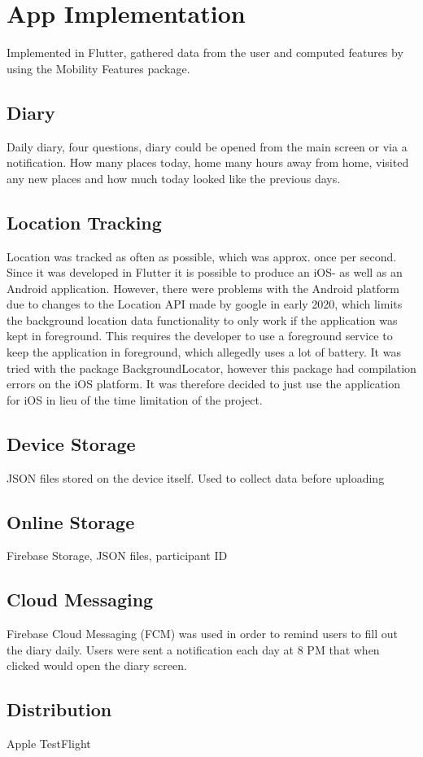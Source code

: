 \section{App Implementation}
Implemented in Flutter, gathered data from the user and computed features by using the Mobility Features package. 

\subsection{Diary}
Daily diary, four questions, diary could be opened from the main screen or via a notification. How many places today, home many hours away from home, visited any new places and how much today looked like the previous days.


\subsection{Location Tracking}
Location was tracked as often as possible, which was approx. once per second. Since it was developed in Flutter it is possible to produce an iOS- as well as an Android application. However, there were problems with the Android platform due to changes to the Location API made by google in early 2020, which limits the background location data functionality to only work if the application was kept in foreground. This requires the developer to use a foreground service to keep the application in foreground, which allegedly uses a lot of battery. It was tried with the package BackgroundLocator, however this package had compilation errors on the iOS platform. It was therefore decided to just use the application for iOS in lieu of the time limitation of the project.

\subsection{Device Storage}
JSON files stored on the device itself. Used to collect data before uploading

\subsection{Online Storage}
Firebase Storage, JSON files, participant ID

\subsection{Cloud Messaging}
Firebase Cloud Messaging (FCM) was used in order to remind users to fill out the diary daily. Users were sent a notification each day at 8 PM that when clicked would open the diary screen. 

\subsection{Distribution}
Apple TestFlight